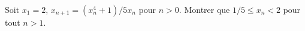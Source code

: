 Soit $x_1 = 2$, $x_{n+1} = (x_n^4 + 1)/5x_n$ pour $n > 0$. Montrer que $1/5 \leq x_n < 2$ pour tout $n > 1$.
